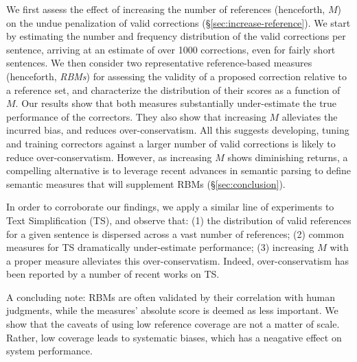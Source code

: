 \documentclass[letterpaper, 11pt]{article}
\begin{document}
We first assess the effect of increasing the number of references (henceforth, $M$) on 
the undue penalization of valid corrections (\S \ref{sec:increase-reference}).
We start by estimating the number and frequency distribution of the valid corrections per sentence, arriving 
at an estimate of over 1000 corrections, even for fairly short sentences.
We then consider two representative reference-based measures (henceforth, {\it RBMs}) for
assessing the validity of a proposed correction relative to a reference set, 
and characterize the distribution of their scores as a function of $M$. 
Our results show that both measures substantially under-estimate the true performance of
the correctors. They also show that increasing $M$ alleviates the incurred bias, 
and reduces over-conservatism. All this suggests developing, tuning and training correctors against a larger number of valid corrections is likely to reduce over-conservatism.
However, as increasing $M$ shows diminishing returns, a compelling alternative
is to leverage recent advances in semantic parsing to define semantic
measures that will supplement RBMs (\S\ref{sec:conclusion}). 

In order to corroborate our findings, we apply a 
similar line of experiments to Text Simplification (TS),
and observe that: (1) the distribution of valid references for a given sentence is dispersed across a vast number of references; 
(2) common measures for TS dramatically under-estimate performance; 
(3) increasing $M$ with a proper measure alleviates this over-conservatism.
Indeed, over-conservatism has been reported by a number of recent works on TS.

A concluding note:
RBMs are often validated by their correlation with human judgments, while the measures' absolute score is deemed as less important. We show that the caveats of using low reference coverage are not a matter of scale.
Rather, low coverage leads to systematic biases, which has a neagative effect on system performance.
\end{document}

